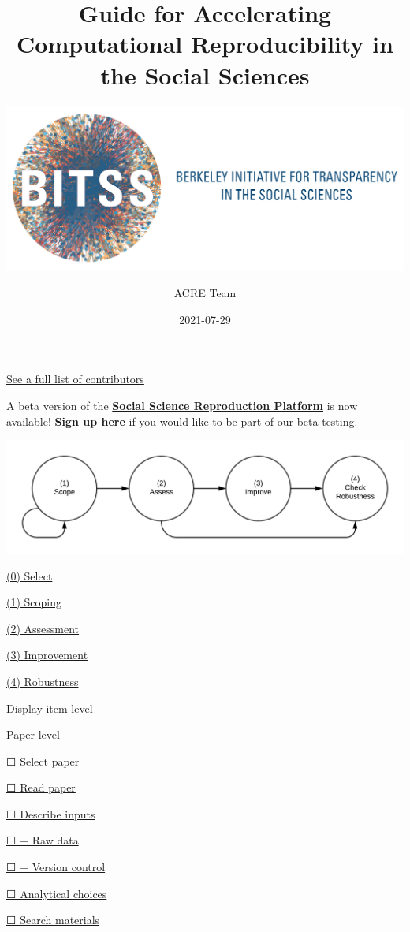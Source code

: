 \documentclass[
]{book}
\title{Guide for Accelerating Computational Reproducibility in the Social Sciences}
\subtitle{\href{https://www.bitss.org/}{\includegraphics{BITSS_logo_horizontal.png}}}
\author{ACRE Team}
\date{2021-07-29}
\begin{document}
\maketitle

{
\setcounter{tocdepth}{1}
\tableofcontents
}
\hypertarget{section}{%
\chapter*{}\label{section}}

\protect\hyperlink{contributions}{See a full list of contributors}

A beta version of the \href{https://www.socialsciencereproduction.org/}{\textbf{Social Science Reproduction Platform}} is now available! \href{https://forms.gle/yZivWcwijCzEhrBU6}{\textbf{Sign up here}} if you would like to be part of our beta testing.

\includegraphics[width=1\linewidth]{stages}

\protect\hyperlink{select}{(0) Select}

\protect\hyperlink{scoping}{(1) Scoping}

\protect\hyperlink{assessment}{(2) Assessment}

\protect\hyperlink{improvements}{(3) Improvement}

\protect\hyperlink{robust}{(4) Robustness}

\protect\hyperlink{di-imp}{Display-item-level}

\protect\hyperlink{paper-level}{Paper-level}

☐ Select paper

\protect\hyperlink{read-summ}{☐ Read paper}

\protect\hyperlink{describe-inputs}{☐ Describe inputs}

\protect\hyperlink{rd}{☐ + Raw data}

\protect\hyperlink{paper-level}{☐ + Version control}

\protect\hyperlink{id-analy}{☐ Analytical choices}

\protect\hyperlink{declaree}{☐ Search materials}
\end{document}
